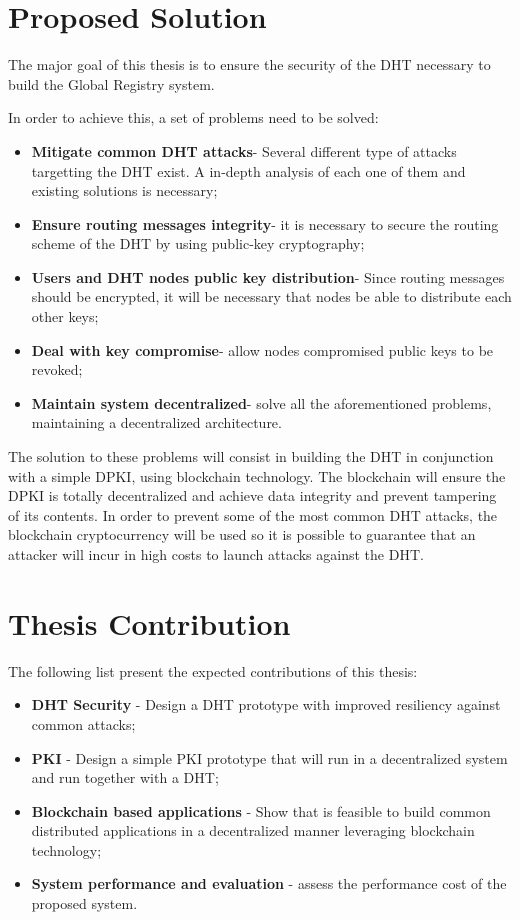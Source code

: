 \section{Proposed Solution}
\label{section:proposed}
The major goal of this thesis is to ensure the security of the \ac{DHT} necessary to build the Global Registry system.

In order to achieve this, a set of problems need to be solved:
\begin{itemize}
  \item \textbf{Mitigate common \ac{DHT} attacks}- Several different type of attacks targetting the \ac{DHT} exist. A in-depth analysis of each one of them and existing solutions is necessary;
	\item \textbf{Ensure routing messages integrity}- it is necessary to secure the routing scheme of the \ac{DHT} by using public-key cryptography;
  \item \textbf{Users and \ac{DHT} nodes public key distribution}- Since routing messages should be encrypted, it will be necessary that nodes be able to distribute each other keys;
	\item \textbf{Deal with key compromise}- allow nodes compromised public keys to be revoked;
	\item \textbf{Maintain system decentralized}- solve all the aforementioned problems, maintaining a decentralized architecture.
\end{itemize}

The solution to these problems will consist in building the \ac{DHT} in conjunction with a simple \ac{DPKI}, using blockchain technology.
The blockchain will ensure the \ac{DPKI} is totally decentralized and achieve data integrity and prevent tampering of its contents. In order to prevent some of the most common \ac{DHT} attacks, the blockchain cryptocurrency will be used so it is possible to guarantee that an attacker will incur in high costs to launch attacks against the DHT.

\section{Thesis Contribution}
\label{section:contribution}
The following list present the expected contributions of this thesis:
\begin{itemize}
	\item \textbf{\ac{DHT} Security} - Design a \ac{DHT} prototype with improved resiliency against common attacks;
	\item \textbf{\ac{PKI}} - Design a simple \ac{PKI} prototype that will run in a decentralized system and run together with a \ac{DHT};
	\item \textbf{Blockchain based applications} - Show that is feasible to build common distributed applications in a decentralized manner leveraging blockchain technology;
	\item \textbf{System performance and evaluation} - assess the performance cost of the proposed system.
\end{itemize}


